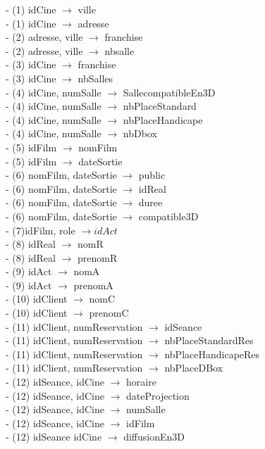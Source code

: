 \documentclass[a4paper,sffamily,12pt]{article}
\begin{document}
				\noindent- (1) idCine $\rightarrow$ ville \\
				- (1) idCine $\rightarrow$ adresse \\
				- (2) adresse, ville $\rightarrow$ franchise \\
				- (2) adresse, ville $\rightarrow$ nbsalle \\
				- (3) idCine $\rightarrow$ franchise \\
				- (3) idCine $\rightarrow$ nbSalles \\
				- (4) idCine, numSalle $\rightarrow$ SallecompatibleEn3D \\
		 		- (4) idCine, numSalle $\rightarrow$ nbPlaceStandard \\
		 		- (4) idCine, numSalle $\rightarrow$ nbPlaceHandicape \\
		 		- (4) idCine, numSalle $\rightarrow$ nbDbox \\
		 		- (5) idFilm $\rightarrow$ nomFilm \\
		 		- (5) idFilm $\rightarrow$ dateSortie \\				 		
				- (6) nomFilm, dateSortie $\rightarrow$ public \\
				- (6) nomFilm, dateSortie $\rightarrow$ idReal \\
				- (6) nomFilm, dateSortie $\rightarrow$ duree \\
				- (6) nomFilm, dateSortie $\rightarrow$ compatible3D \\
				- (7)idFilm, role $\rightarrow idAct$ \\
				- (8) idReal $\rightarrow$ nomR \\
				- (8) idReal $\rightarrow$ prenomR \\						
				- (9) idAct $\rightarrow$ nomA \\
				- (9) idAct $\rightarrow$ prenomA \\						
				- (10) idClient $\rightarrow$ nomC \\
				- (10) idClient $\rightarrow$ prenomC \\						
				- (11) idClient, numReservation $\rightarrow$ idSeance \\
				- (11) idClient, numReservation $\rightarrow$ nbPlaceStandardRes \\
				- (11) idClient, numReservation $\rightarrow$ nbPlaceHandicapeRes \\
				- (11) idClient, numReservation $\rightarrow$ nbPlaceDBox \\
				- (12) idSeance, idCine $\rightarrow$ horaire \\
				- (12) idSeance, idCine $\rightarrow$ dateProjection \\
				- (12) idSeance, idCine $\rightarrow$ numSalle \\
				- (12) idSeance, idCine $\rightarrow$ idFilm \\
				- (12) idSeance  idCine $\rightarrow$ diffusionEn3D \\
		
\end{document}
